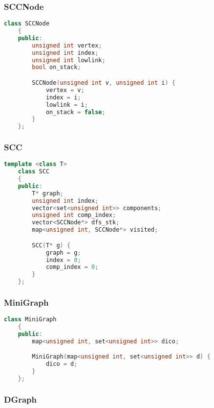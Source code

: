 \subsubsection{SCCNode}

\begin{lstlisting}[language=C++, style=cpp, caption={Defining the SCCNode with C++}, label={lst:cpp-define-sccnode}, firstnumber=1]
    class SCCNode
    {
    public:
        unsigned int vertex;
        unsigned int index;
        unsigned int lowlink;
        bool on_stack;

        SCCNode(unsigned int v, unsigned int i) {
            vertex = v;
            index = i;
            lowlink = i;
            on_stack = false;
        }
    };
\end{lstlisting}

\subsubsection{SCC}

\begin{lstlisting}[language=C++, style=cpp, caption={Defining the SCC with C++}, label={lst:cpp-define-scc}, firstnumber=1]
    template <class T>
    class SCC
    {
    public:
        T* graph;
        unsigned int index;
        vector<set<unsigned int>> components;
        unsigned int comp_index;
        vector<SCCNode*> dfs_stk;
        map<unsigned int, SCCNode*> visited;

        SCC(T* g) {
            graph = g;
            index = 0;
            comp_index = 0;
        }
    };
\end{lstlisting}

\subsubsection{MiniGraph}

\begin{lstlisting}[language=C++, style=cpp, caption={Defining the MiniGraph with C++}, label={lst:cpp-define-mini-graph}, firstnumber=1]
    class MiniGraph
    {
    public:
        map<unsigned int, set<unsigned int>> dico;

        MiniGraph(map<unsigned int, set<unsigned int>> d) {
            dico = d;
        }
    };
\end{lstlisting}

\subsubsection{DGraph}

